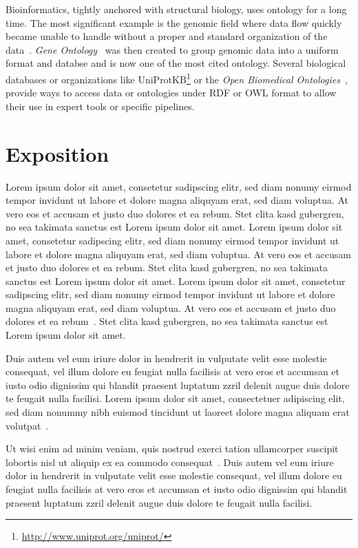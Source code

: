 \documentclass{vgtc}                          %
\begin{document}
Bioinformatics, tightly anchored with structural biology, uses ontology for a long time. The most significant example is the genomic field where data flow quickly became unable to handle without a proper and standard organization of the data~\cite{schuurman}. \textit{Gene Ontology}~\cite{ashburner} was then created to group genomic data into a uniform format and databse and is now one of the most cited ontology. Several biological databases or organizations like UniProtKB\footnote{\url{http://www.uniprot.org/uniprot/}} or the \textit{Open Biomedical Ontologies}~\cite{}, provide ways to access data or ontologies under RDF or OWL format to allow their use in expert tools or specific pipelines.

\section{Exposition}

Lorem ipsum dolor sit amet, consetetur sadipscing elitr, sed diam
nonumy eirmod tempor invidunt ut labore et dolore magna aliquyam erat,
sed diam voluptua. At vero eos et accusam et justo duo dolores et ea
rebum. Stet clita kasd gubergren, no sea takimata sanctus est Lorem
ipsum dolor sit amet. Lorem ipsum dolor sit amet, consetetur
sadipscing elitr, sed diam nonumy eirmod tempor invidunt ut labore et
dolore magna aliquyam erat, sed diam voluptua. At vero eos et accusam
et justo duo dolores et ea rebum. Stet clita kasd gubergren, no sea
takimata sanctus est Lorem ipsum dolor sit amet. Lorem ipsum dolor sit
amet, consetetur sadipscing elitr, sed diam nonumy eirmod tempor
invidunt ut labore et dolore magna aliquyam erat, sed diam
voluptua. At vero eos et accusam et justo duo dolores et ea
rebum~\cite{ware:2004:IVP}. Stet clita kasd gubergren, no sea takimata
sanctus est Lorem ipsum dolor sit amet.

Duis autem vel eum iriure dolor in hendrerit in vulputate velit esse
molestie consequat, vel illum dolore eu feugiat nulla facilisis at
vero eros et accumsan et iusto odio dignissim qui blandit praesent
luptatum zzril delenit augue duis dolore te feugait nulla
facilisi. Lorem ipsum dolor sit amet, consectetuer adipiscing elit,
sed diam nonummy nibh euismod tincidunt ut laoreet dolore magna
aliquam erat volutpat~\cite{kindlmann:1999:SAG}.

Ut wisi enim ad minim veniam, quis nostrud exerci tation ullamcorper
suscipit lobortis nisl ut aliquip ex ea commodo
consequat~\cite{levoy:1989:DSV}. Duis autem vel eum iriure dolor in
hendrerit in vulputate velit esse molestie consequat, vel illum dolore
eu feugiat nulla facilisis at vero eros et accumsan et iusto odio
dignissim qui blandit praesent luptatum zzril delenit augue duis
dolore te feugait nulla facilisi.
\end{document}

